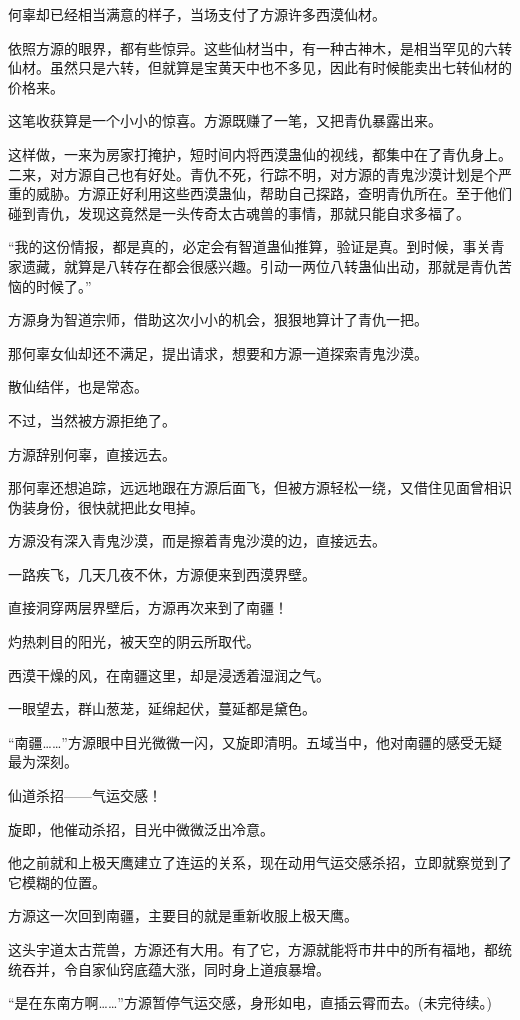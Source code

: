 \begin{this_body}
何辜却已经相当满意的样子，当场支付了方源许多西漠仙材。

依照方源的眼界，都有些惊异。这些仙材当中，有一种古神木，是相当罕见的六转仙材。虽然只是六转，但就算是宝黄天中也不多见，因此有时候能卖出七转仙材的价格来。

这笔收获算是一个小小的惊喜。方源既赚了一笔，又把青仇暴露出来。

这样做，一来为房家打掩护，短时间内将西漠蛊仙的视线，都集中在了青仇身上。二来，对方源自己也有好处。青仇不死，行踪不明，对方源的青鬼沙漠计划是个严重的威胁。方源正好利用这些西漠蛊仙，帮助自己探路，查明青仇所在。至于他们碰到青仇，发现这竟然是一头传奇太古魂兽的事情，那就只能自求多福了。

“我的这份情报，都是真的，必定会有智道蛊仙推算，验证是真。到时候，事关青家遗藏，就算是八转存在都会很感兴趣。引动一两位八转蛊仙出动，那就是青仇苦恼的时候了。”

方源身为智道宗师，借助这次小小的机会，狠狠地算计了青仇一把。

那何辜女仙却还不满足，提出请求，想要和方源一道探索青鬼沙漠。

散仙结伴，也是常态。

不过，当然被方源拒绝了。

方源辞别何辜，直接远去。

那何辜还想追踪，远远地跟在方源后面飞，但被方源轻松一绕，又借住见面曾相识伪装身份，很快就把此女甩掉。

方源没有深入青鬼沙漠，而是擦着青鬼沙漠的边，直接远去。

一路疾飞，几天几夜不休，方源便来到西漠界壁。

直接洞穿两层界壁后，方源再次来到了南疆！

灼热刺目的阳光，被天空的阴云所取代。

西漠干燥的风，在南疆这里，却是浸透着湿润之气。

一眼望去，群山葱茏，延绵起伏，蔓延都是黛色。

“南疆……”方源眼中目光微微一闪，又旋即清明。五域当中，他对南疆的感受无疑最为深刻。

仙道杀招——气运交感！

旋即，他催动杀招，目光中微微泛出冷意。

他之前就和上极天鹰建立了连运的关系，现在动用气运交感杀招，立即就察觉到了它模糊的位置。

方源这一次回到南疆，主要目的就是重新收服上极天鹰。

这头宇道太古荒兽，方源还有大用。有了它，方源就能将市井中的所有福地，都统统吞并，令自家仙窍底蕴大涨，同时身上道痕暴增。

“是在东南方啊……”方源暂停气运交感，身形如电，直插云霄而去。(未完待续。)

\end{this_body}

